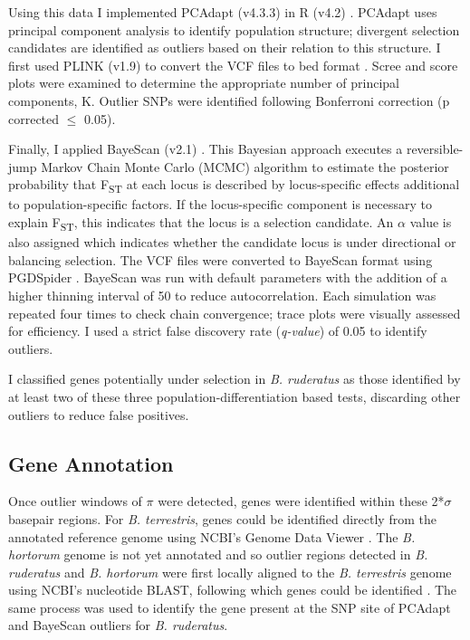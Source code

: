 \documentclass[12pt]{article}
\begin{document}
\begin{linenumbers}
		Using this data I implemented PCAdapt (v4.3.3) in R (v4.2)  \citep{duforet-frebourg_detecting_2016, luu_pcadapt_2017, prive_performing_2020, r_core_team_r_2022}. PCAdapt uses principal component analysis to identify population structure; divergent selection candidates are identified as outliers based on their relation to this structure. I first used PLINK (v1.9) to convert the VCF files to bed format \citep{chang_second-generation_2015, purcell_plink_2007, purcell_plink_2022}. Scree and score plots were examined to determine the appropriate number of principal components, K. Outlier SNPs were identified following Bonferroni correction (p corrected $\leq$ 0.05).
		
		Finally, I applied BayeScan (v2.1) \citep{foll_genome-scan_2008}. This Bayesian approach executes a reversible-jump Markov Chain Monte Carlo (MCMC) algorithm to estimate the posterior probability that F\textsubscript{ST} at each locus is described by locus-specific effects additional to population-specific factors. If the locus-specific component is necessary to explain F\textsubscript{ST}, this indicates that the locus is a selection candidate. An $\alpha$ value is also assigned which indicates whether the candidate locus is under directional or balancing selection. 
		The VCF files were converted to BayeScan format using PGDSpider \citep{lischer_pgdspider_2012}. BayeScan was run with default parameters with the addition of a higher thinning interval of 50 to reduce autocorrelation. 
		Each simulation was repeated four times to check chain convergence; trace plots were visually assessed for efficiency. I used a strict false discovery rate (\emph{q-value}) of 0.05 to identify outliers. 
		
		I classified genes potentially under selection in \emph{B. ruderatus} as those identified by at least two of these three population-differentiation based tests, discarding other outliers to reduce false positives.
		

		\subsection{Gene Annotation}
		
		Once outlier windows of $\pi$ were detected, genes were identified within these 2*$\sigma$ basepair regions. 
		For \emph{B. terrestris}, genes could be identified directly from the annotated reference genome using NCBI's Genome Data Viewer \citep{rangwala_accessing_2021}. The \emph{B. hortorum} genome is not yet annotated and so outlier regions detected in \emph{B. ruderatus} and \emph{B. hortorum} were first locally aligned to the \emph{B. terrestris} genome using NCBI's nucleotide BLAST, following which genes could be identified \citep{altschul_basic_1990}. The same process was used to identify the gene present at the SNP site of PCAdapt and BayeScan outliers for \emph{B. ruderatus}. 
		

\end{linenumbers}
\end{document}
